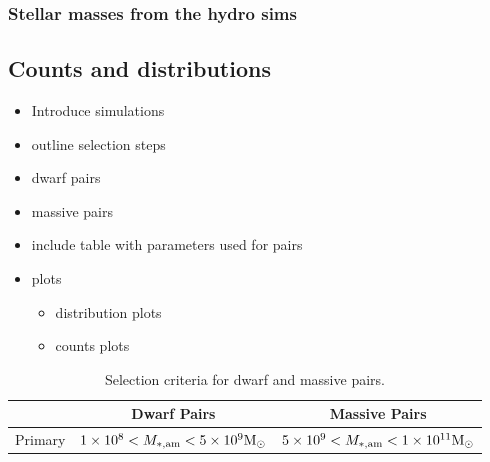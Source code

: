 \documentclass[twocolumn]{aastex631}
\begin{document}
\subsubsection{Stellar masses from the hydro sims}


\subsection{Counts and distributions}\label{sec:methods-counts}

\begin{itemize}
  \item Introduce simulations
  \item outline selection steps
  \item dwarf pairs
  \item massive pairs
  \item include table with parameters used for pairs
  \item plots
    \begin{itemize}
      \item distribution plots
      \item counts plots
    \end{itemize}
\end{itemize}


\begin{table}[htb]
  \centering
    \begin{tabular}{lcc}
     & Dwarf Pairs & Massive Pairs \\\hline\hline
    Primary &$1\times10^{8} < M_{*,\mathrm{am}} < 5\times10^{9} \mathrm{M}_\odot$ & $5\times10^{9} < M_{*,\mathrm{am}} < 1\times10^{11} \mathrm{M}_\odot$\\\hline
    \end{tabular}
    \caption{\label{table:mass}Selection criteria for dwarf and massive pairs.}
    \end{table}
\end{document}
